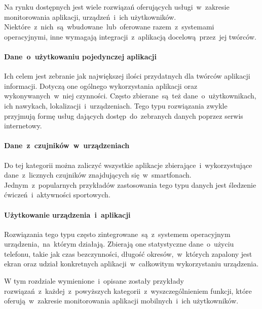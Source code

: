 Na rynku dostępnych jest wiele rozwiązań oferujących usługi~w~zakresie monitorowania aplikacji, urządzeń~i~ich użytkowników. Niektóre~z~nich~są~wbudowane~lub~oferowane razem~z~systemami operacyjnymi, inne wymagają integracji~z~aplikacją docelową~przez~jej twórców.

\paragraph{Dane~o~użytkowaniu pojedynczej aplikacji} 
Ich celem jest zebranie jak największej ilości przydatnych dla twórców aplikacji informacji. Dotyczą one ogólnego wykorzystania aplikacji oraz wykonywanych~w~niej czynności. Często zbierane~są~też dane~o~użytkownikach, ich nawykach, lokalizacji~i~urządzeniach. Tego typu rozwiązania zwykle przyjmują formę usług dających dostęp~do~zebranych danych poprzez serwis internetowy. 

\paragraph{Dane~z~czujników~w~urządzeniach} 
Do tej kategorii można zaliczyć wszystkie aplikacje zbierające~i~wykorzystujące dane~z~licznych czujników znajdujących się~w~smartfonach. Jednym~z~popularnych przykładów zastosowania tego typu danych jest śledzenie ćwiczeń~i~aktywności sportowych.

\paragraph{Użytkowanie urządzenia~i~aplikacji} 
Rozwiązania tego typu często zintegrowane~są~z~systemem operacyjnym urządzenia,~na~którym działają. Zbierają one statystyczne dane~o~użyciu telefonu, takie jak czas bezczynności, długość okresów,~w~których zapalony jest ekran oraz udział konkretnych aplikacji~w~całkowitym wykorzystaniu urządzenia.
\bigskip

W tym rozdziale wymienione~i~opisane zostały przykłady rozwiązań~z~każdej~z~powyższych kategorii~z~wyszczególnieniem funkcji, które oferują~w~zakresie monitorowania aplikacji mobilnych~i~ich użytkowników.
